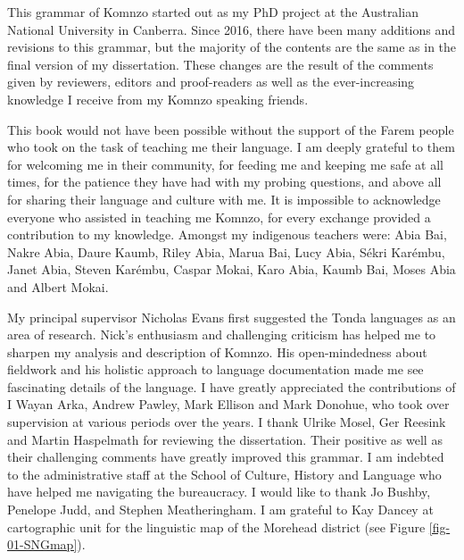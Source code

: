 

This grammar of Komnzo started out as my PhD project at the Australian National University in Canberra. Since 2016, there have been many additions and revisions to this grammar, but the majority of the contents are the same as in the final version of my dissertation. These changes are the result of the comments given by reviewers, editors and proof-readers as well as the ever-increasing knowledge I receive from my Komnzo speaking friends.

This book would not have been possible without the support of the Farem people who took on the task of teaching me their language. I am deeply grateful to them for welcoming me in their community, for feeding me and keeping me safe at all times, for the patience they have had with my probing questions, and above all for sharing their language and culture with me. It is impossible to acknowledge everyone who assisted in teaching me Komnzo, for every exchange provided a contribution to my knowledge. Amongst my indigenous teachers were: Abia Bai, Nakre Abia, Daure Kaumb, Riley Abia, \textsuperscript{\dag}Marua Bai, Lucy Abia, Sékri Karémbu, Janet Abia, Steven Karémbu, Caspar Mokai, Karo Abia, Kaumb Bai, Moses Abia and Albert Mokai.

My principal supervisor Nicholas Evans first suggested the Tonda languages as an area of research. Nick's enthusiasm and challenging criticism has helped me to sharpen my analysis and description of Komnzo. His open-mindedness about fieldwork and his holistic approach to language documentation made me see fascinating details of the language. I have greatly appreciated the contributions of I Wayan Arka, Andrew Pawley, Mark Ellison and Mark Donohue, who took over supervision at various periods over the years. I thank Ulrike Mosel, Ger Reesink and Martin Haspelmath for reviewing the dissertation. Their positive as well as their challenging comments have greatly improved this grammar. I am indebted to the administrative staff at the School of Culture, History and Language who have helped me navigating the bureaucracy. I would like to thank Jo Bushby, Penelope Judd, and Stephen Meatheringham. I am grateful to Kay Dancey at cartographic unit for the linguistic map of the Morehead district (see Figure \ref{fig-01-SNGmap}).

